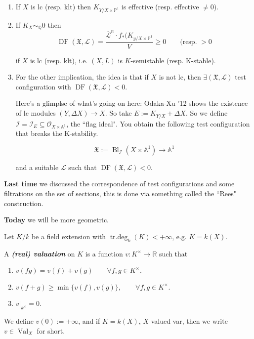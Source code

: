 \medskip{}
\begin{enumerate}
\item If $X$ is lc (resp. klt) then  $K_{Y/X
\times \mathbb{P}^1}$ is effective (resp.
effective $\neq 0$).
\item If $K_X \sim_\mathbb{Q} 0$ then
$$
\operatorname{DF}(\mathfrak{X},\mathcal{L})=
\frac{\overline{\mathcal{L}}^n\cdot
f_*(K_{y/X \times \mathbb{P}^1}}{V} \geq 0
\qquad \text{(resp. $>0$}
$$

if $X$ is lc (resp. klt), i.e. $(X,L)$ is
$K$-semistable (resp. K-stable).

\item For the other implication, the idea is
that if $X$ is not lc, then $\exists
(\mathfrak{X},\mathcal{L})$ test
configuration with
$\operatorname{DF}(\mathfrak{X},
\mathcal{L})<0$.

Here's a glimplse of what's going on here:
Odaka-Xu '12 shows the existence of lc
modules $(Y,\Delta X) \to X$. So take $E:=
K_{Y/X}+ \Delta X$. So we define
$\mathcal{I}=\mathcal{I}_E\subseteq
\mathcal{O}_{X \times \mathbb{A}^1}$, the
``flag ideal". You obtain the following test
configuration that breaks the K-stability.

$$
\mathfrak{X}:=
\operatorname{Bl}_\mathcal{I}(X \times
\mathbb{A}^1) \to \mathbb{A}^1
$$

and a suitable $\mathcal{L}$ such that
$\operatorname{DF}(\mathfrak{X},
\mathcal{L})<0$.
\end{enumerate}

\medskip{}

\medskip{}

{\bf Last time}  we discussed the
correspondence of test configurations and
some filtrations on the set of sections, this
is done via something called the ``Rees"
construction.

{\bf Today}  we will be more geometric.

Let $K/k$ be a field extension with
$\operatorname{tr.deg}_k(K)<+\infty$, e.g.
$K=k(X)$.

A  \textit{\textbf{(real) valuation}} on $K$
is a function $v:K^\times \longrightarrow
\mathbb{R}$ such that
\begin{enumerate}
\item $v(fg)=v(f)+v(g)\qquad \forall f,g \in
K^\times$.
\item $v(f+g) \geq
\operatorname{min}\{v(f),v(g)\}, \qquad
\forall f,g \in K^\times$.
\item $v|_{k^\times}=0$.
\end{enumerate}
We define $v(0):=+\infty$, and if $K=k(X)$,
$X$ valued var, then we write  $v \in
\operatorname{Val}_X$ for short.


